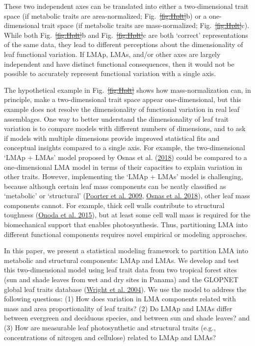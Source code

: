 \documentclass[
  12pt,
  a4paper,
,tablecaptionabove
]{scrartcl}
\providecommand{\DIFaddtex}[1]{{\protect\color{blue}\uwave{#1}}} %
\providecommand{\DIFdeltex}[1]{{\protect\color{red}\sout{#1}}}                      %
\providecommand{\DIFaddbegin}{} %
\providecommand{\DIFaddend}{} %
\providecommand{\DIFdelbegin}{} %
\providecommand{\DIFdelend}{} %
\providecommand{\DIFadd}[1]{\texorpdfstring{\DIFaddtex{#1}}{#1}} %
\providecommand{\DIFdel}[1]{\texorpdfstring{\DIFdeltex{#1}}{}} %
\newcommand{\DIFscaledelfig}{0.5}
\newlength{\DIFdelgraphicswidth} %
\newlength{\DIFdelgraphicsheight} %
\newcommand{\DIFaddincludegraphics}[2][]{{\color{blue}\fbox{\DIFOincludegraphics[#1]{#2}}}} %
\newcommand{\DIFdelincludegraphics}[2][]{%
\sbox{\DIFdelgraphicsbox}{\DIFOincludegraphics[#1]{#2}}%
\settoboxwidth{\DIFdelgraphicswidth}{\DIFdelgraphicsbox} %
\settoboxtotalheight{\DIFdelgraphicsheight}{\DIFdelgraphicsbox} %
\scalebox{\DIFscaledelfig}{%
\parbox[b]{\DIFdelgraphicswidth}{\usebox{\DIFdelgraphicsbox}\\[-\baselineskip] \rule{\DIFdelgraphicswidth}{0em}}\llap{\resizebox{\DIFdelgraphicswidth}{\DIFdelgraphicsheight}{%
\setlength{\unitlength}{\DIFdelgraphicswidth}%
\begin{picture}(1,1)%
\thicklines\linethickness{2pt} %
{\color[rgb]{1,0,0}\put(0,0){\framebox(1,1){}}}%
{\color[rgb]{1,0,0}\put(0,0){\line( 1,1){1}}}%
{\color[rgb]{1,0,0}\put(0,1){\line(1,-1){1}}}%
\end{picture}%
}\hspace*{3pt}}} %
} %
\DeclareRobustCommand{\DIFaddbegin}{\DIFOaddbegin \let\includegraphics\DIFaddincludegraphics} %
\DeclareRobustCommand{\DIFaddend}{\DIFOaddend \let\includegraphics\DIFOincludegraphics} %
\DeclareRobustCommand{\DIFdelbegin}{\DIFOdelbegin \let\includegraphics\DIFdelincludegraphics} %
\DeclareRobustCommand{\DIFdelend}{\DIFOaddend \let\includegraphics\DIFOincludegraphics} %
\begin{document}
\DIFaddend These two independent axes can be translated into either a
two-dimensional trait space (if metabolic traits are area-normalized;
Fig.~\DIFdelbegin \DIFdel{\ref{fig:Hplt}}\DIFdelend \DIFaddbegin \DIFadd{\ref{fig-Hplt}}\DIFaddend b) or a one-dimensional trait space (if metabolic
traits are mass-normalized; Fig.~\DIFdelbegin \DIFdel{\ref{fig:Hplt}}\DIFdelend \DIFaddbegin \DIFadd{\ref{fig-Hplt}}\DIFaddend c). While both
Fig.~\DIFdelbegin \DIFdel{\ref{fig:Hplt}}\DIFdelend \DIFaddbegin \DIFadd{\ref{fig-Hplt}}\DIFaddend b and Fig.~\DIFdelbegin \DIFdel{\ref{fig:Hplt}}\DIFdelend \DIFaddbegin \DIFadd{\ref{fig-Hplt}}\DIFaddend c are both `correct'
representations of the same data, they lead to different perceptions
about the dimensionality of leaf functional variation. If LMAp, LMAs,
and/or other axes are largely independent and have distinct functional
consequences, then it would not be possible to accurately represent
functional variation with a single axis.

The hypothetical example in Fig.~\DIFdelbegin \DIFdel{\ref{fig:Hplt} }\DIFdelend \DIFaddbegin \DIFadd{\ref{fig-Hplt} }\DIFaddend shows how
mass-normalization can, in principle, make a two-dimensional trait space
appear one-dimensional, but this example does not resolve the
dimensionality of functional variation in real leaf assemblages. One way
to better understand the dimensionality of leaf trait variation is to
compare models with different numbers of dimensions, and to ask if
models with multiple dimensions provide improved statistical fits and
conceptual insights compared to a single axis. For example, the
two-dimensional `LMAp + LMAs' model proposed by Osnas et al.
(\protect\hyperlink{ref-Osnas2018}{2018}) could be compared to a
one-dimensional LMA model in terms of their capacities to explain
variation in other traits. However, implementing the `LMAp + LMAs' model
is challenging, because although certain leaf mass components can be
neatly classified as `metabolic' or `structural'
(\protect\hyperlink{ref-Poorter2009}{Poorter et al. 2009},
\protect\hyperlink{ref-Osnas2018}{Osnas et al. 2018}), other leaf mass
components cannot. For example, thick cell walls contribute to
structural toughness (\protect\hyperlink{ref-Onoda2015}{Onoda et al.
2015}), but at least some cell wall mass is required for the
biomechanical support that enables photosynthesis. Thus, partitioning
LMA into different functional components requires novel empirical or
modeling approaches.

In this paper, we present a statistical modeling framework to partition
LMA into metabolic and structural components: LMAp and LMAs. We develop
and test this two-dimensional model using leaf trait data from two
tropical forest sites (sun and shade leaves from wet and dry sites in
Panama) and the GLOPNET global leaf traits database
(\protect\hyperlink{ref-Wright2004a}{Wright et al. 2004}). We use the
model to address the following questions: (1) How does variation in LMA
components related with mass and area proportionality of leaf traits?
(2) Do LMAp and LMAs differ between evergreen and deciduous species, and
between sun and shade leaves? and (3) How are measurable leaf
photosynthetic and structural traits (e.g., concentrations of nitrogen
and cellulose) related to LMAp and LMAs?
\end{document}
